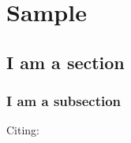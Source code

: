\chapter{Sample}

\minitoc\pagebreak


\section{I am a section}

\lipsum


\subsection{I am a subsection}

Citing: \cite{Sample2016}

\lipsum
